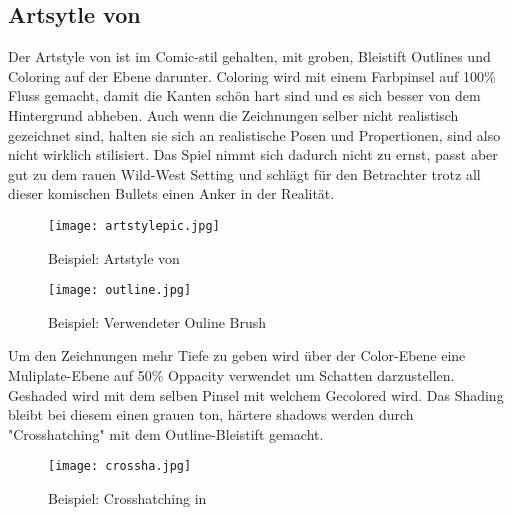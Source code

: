\subsection{Artsytle von \FF}\label{subsec:artsytle}

Der Artstyle von \FF ist im Comic-stil gehalten, mit groben, Bleistift Outlines und Coloring auf der Ebene darunter.
Coloring wird mit einem Farbpinsel auf 100\% Fluss gemacht, damit die Kanten schön hart sind und es sich besser von dem Hintergrund abheben.
Auch wenn die Zeichnungen selber nicht realistisch gezeichnet sind, halten sie sich an realistische Posen und Propertionen, sind also nicht wirklich stilisiert.
Das Spiel nimmt sich dadurch nicht zu ernst, passt aber gut zu dem rauen Wild-West Setting und schlägt für den Betrachter trotz all dieser komischen Bullets
einen Anker in der Realität.

\begin{figure}[H]
    \centering
    \texttt{[image: artstylepic.jpg]}
    \caption{Beispiel: Artstyle von \FF}
\end{figure}

\begin{figure}[H]
    \centering
    \texttt{[image: outline.jpg]}
    \caption{Beispiel: Verwendeter Ouline Brush}
\end{figure}



Um den Zeichnungen mehr Tiefe zu geben wird über der Color-Ebene eine Muliplate-Ebene auf 50\% Oppacity verwendet um Schatten
darzustellen. Geshaded wird mit dem selben Pinsel mit welchem Gecolored wird. Das Shading bleibt bei diesem einen grauen ton,
härtere shadows werden durch "Crosshatching" mit dem Outline-Bleistift gemacht.

\begin{figure}[H]
    \texttt{[image: crossha.jpg]}
    \caption{Beispiel: Crosshatching in \FF}
\end{figure}

\renewcommand{\kapitelautor}{}
